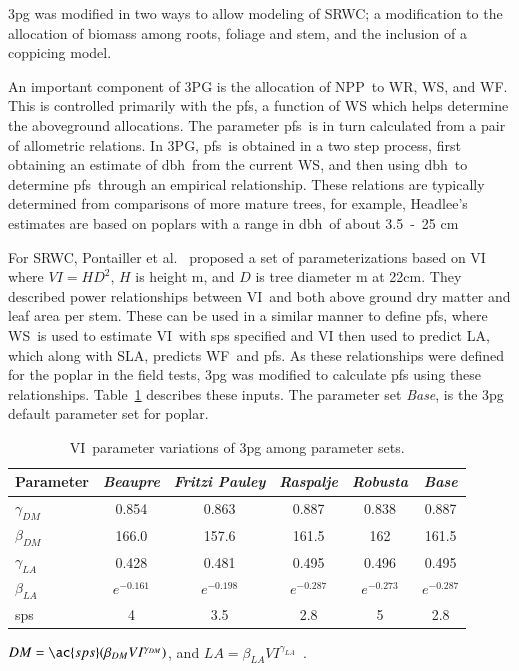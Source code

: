 \documentclass[preprint,review,12pt]{elsarticle}
\begin{document}
\ac{3pg} was modified in two ways to allow modeling of \ac{SRWC}; a
modification to the allocation of biomass among roots, foliage and
stem, and the inclusion of a coppicing model.

An important component of 3PG is the allocation of \ac{NPP}~to
\ac{WR}, \ac{WS}, and \ac{WF}.  This is controlled primarily with the
\ac{pfs}, a function of \ac{WS} which helps determine the aboveground
allocations.  The parameter \ac{pfs}~is in turn calculated from a pair of allometric
relations.  In 3PG, \ac{pfs}~is obtained in a two step process, first
obtaining an estimate of \ac{dbh}~from the current \ac{WS}, and then
using \ac{dbh}~to determine \ac{pfs}~through an empirical
relationship.  These relations are typically determined from
comparisons of more mature trees, for example, Headlee's estimates are
based on poplars with a range in \ac{dbh}~of about 3.5~-~25
cm~\cite{Headlee2012}%

For \ac{SRWC}, Pontailler et al.~\cite{pontailler97-volume-index}
proposed a set of parameterizations based on \ac{VI} where $VI =
HD^2$, $H$ is height m, and $D$ is tree diameter m at 22cm.  They
described power relationships between \ac{VI}~and both above ground
dry matter and leaf area per stem. These can be used in a similar
manner to define \ac{pfs}, where \ac{WS}~is used to estimate
\ac{VI}~with \ac{sps} specified and \ac{VI} then used to predict
\ac{LA}, which along with \ac{SLA}, predicts \ac{WF}~and \ac{pfs}. As
these relationships were defined for the poplar in the field tests,
\ac{3pg} was modified to calculate \ac{pfs} using these relationships.
Table~\ref{tab:pont-3pg} describes these inputs.  The parameter set
\emph{Base}, is the \ac{3pg} default parameter set for poplar.

\begin{table}%
  \caption{\acf{VI}~parameter variations of \ac{3pg} among parameter sets.}
  \begin{tabular}{|lccccc|}
    \hline
    Parameter & \emph{Beaupre} & \emph{Fritzi Pauley} & \emph{Raspalje} & \emph{Robusta} & \emph{Base}\\
    \hline
    $\gamma_{DM}$ &  0.854 & 0.863 & 0.887 & 0.838 & 0.887\\
    $\beta_{DM}$  & 166.0 & 157.6 & 161.5 & 162 & 161.5\\
    $\gamma_{LA}$ &  0.428 &  0.481 & 0.495 & 0.496 & 0.495\\ 
    $\beta_{LA}$ & $e^{-0.161}$ & $e^{-0.198}$ & $e^{-0.287}$ & $e^{-0.273}$ & $e^{-0.287}$\\
    \ac{sps} & 4 & 3.5 & 2.8 & 5 & 2.8\\
    \hline 
  \end{tabular}
  \begin{flushleft}$DM=\ac{sps}(\beta_{DM} VI^{\gamma_{DM}})$, and $LA = \beta_{LA} VI^{\gamma_{LA}}$~\cite{pontailler97-volume-index}.
\end{flushleft}  
\label{tab:pont-3pg}
\end{table}
\end{document}

